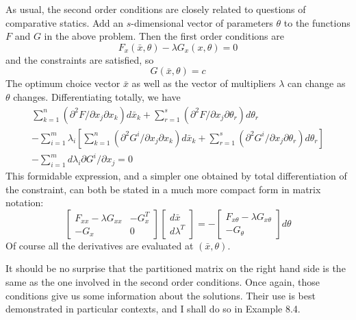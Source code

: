 As usual, the second order conditions are closely related to questions of comparative statics. Add an $s$-dimensional vector of parameters $\theta$
 to the functions $F$ and $G$ in the above problem. Then the first order conditions are
\begin{equation*}
F_x (\bar{x}, \theta) - \lambda G_x (x, \theta) =0
\end{equation*}
and the constraints are satisfied, so
\begin{equation*}
  G (\bar{x}, \theta) = c
\end{equation*}
The optimum choice vector $\bar{x}$ as well as the vector of multipliers $\lambda$ can change as $\theta$ changes. Differentiating totally, we have
\begin{equation*}
\begin{array}{l}
 \sum\limits_{k=1}^n (\partial^2 F/ \partial x_j \partial x_k) d \bar{x}_k +
\sum\limits_{r=1}^s (\partial^2 F/ \partial x_j \partial \theta_r) d \theta_r \\ 
 -\sum\limits_{i=1}^m \lambda_i \left[ \sum\limits_{k=1}^n (\partial^2 G^i / \partial x_j \partial x_k) d \bar{x}_k + \sum\limits_{r=1}^s (\partial^2 G^i/ \partial x_j \partial \theta_r) d \theta_r  \right] \\
 - \sum\limits_{i=1}^m d \lambda_i \partial G^i / \partial x_j = 0
\end{array}
\end{equation*}
This formidable expression, and a simpler one obtained by total differentiation of the constraint, can both be stated in a much more compact form in matrix notation:
\begin{equation} \label{equa8.12}
\left[
\begin{array}{cc}
F_{xx} - \lambda G_{xx}  & -G_x^T \\
-G_x   & 0
\end{array}
\right]
\left[
\begin{array}{c}
 d \bar{x}   \\
 d \lambda^T
\end{array}
\right] = -
\left[
\begin{array}{cc}
F_{x \theta} - \lambda G_{x \theta}  \\
-G_\theta   
\end{array}
\right] d \theta
\end{equation}
Of course all the derivatives are evaluated at $(\bar{x}, \theta)$.

It should be no surprise that the partitioned matrix on the right hand side is the same as the one involved in the second order conditions. Once again, those conditions give us some information about the solutions. Their use is best demonstrated in particular contexts, and I shall do so in Example 8.4.

